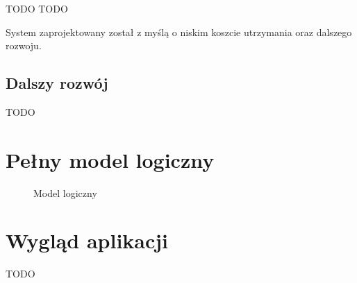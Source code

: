 \documentclass[a4paper,onecolumn,oneside,11pt,wide,floatssmall]{mwrep}
\theoremstyle{definition}
\theoremstyle{plain}%
\theoremstyle{remark}
\begin{document}
TODO TODO

System zaprojektowany został z myślą o niskim koszcie utrzymania oraz dalszego rozwoju.

\section{Dalszy rozwój}
TODO

\appendix


\chapter{Pełny model logiczny}
\label{dodatek-model-logiczny}
\begin{figure}[H]
  \begin{center}
  \end{center}
  \caption{Model logiczny}
  \label{fig:db-logical-model-full}
\end{figure}

\chapter{Wygląd aplikacji}
TODO


\nocite{*}


% 

\end{document}
